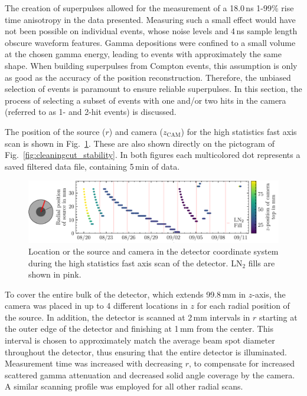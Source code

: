 The creation of superpulses allowed for the measurement of a 18.0\,ns 1-99\% rise time anisotropy in the \BaS{} data presented. Measuring such a small effect would have not been possible on individual events, whose noise levels and 4\,ns sample length obscure waveform features. Gamma depositions were confined to a small volume at the chosen gamma energy, leading to events with approximately the same shape. When building superpulses from Compton events, this assumption is only as good as the accuracy of the position reconstruction. Therefore, the unbiased selection of events is paramount to ensure reliable superpulses. In this section, the process of selecting a subset of events with one and/or two hits in the camera (referred to as 1- and 2-hit events) is discussed. 

The position of the source ($r$) and camera ($z_\text{CAM}$) for the high statistics fast axis scan is shown in Fig.~\ref{fig:scan_schematic}. These are also shown directly on the pictogram of Fig.~\ref{fig:cleaningcut_stability}. In both figures each multicolored dot represents a saved filtered data file, containing 5\,min of data. 
\begin{figure}[htb]
    \centering
    \includegraphics[width=6in]{figs/pipeline/scan_schematic.pdf}
    \caption{Location or the \CsS{} source and camera in the detector coordinate system during the high statistics fast axis scan of the detector. LN$_2$ fills are shown in pink.}
    \label{fig:scan_schematic}
\end{figure}
To cover the entire bulk of the detector, which extends 99.8\,mm in $z$-axis, the camera was placed in up to 4 different locations in $z$ for each radial position of the source. In addition, the detector is scanned at 2\,mm intervals in $r$ starting at the outer edge of the detector and finishing at 1\,mm from the center. This interval is chosen to approximately match the average \CsS{} beam spot diameter throughout the detector, thus ensuring that the entire detector is illuminated. Measurement time was increased with decreasing $r$, to compensate for increased scattered gamma attenuation and decreased solid angle coverage by the camera. A similar scanning profile was employed for all other radial scans.  


